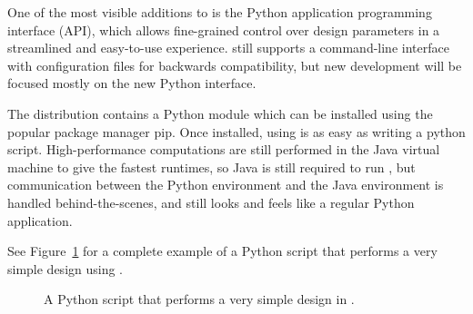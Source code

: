 
One of the most visible additions to  is the Python application programming interface (API), which allows fine-grained control over design parameters in a streamlined and easy-to-use experience.  still supports a command-line interface with configuration files for backwards compatibility, but new development will be focused mostly on the new Python interface. %

The  distribution contains a Python module which can be installed using the popular package manager {\sc pip}. Once installed, using  is as easy as writing a python script. High-performance computations are still performed in the Java virtual machine to give the fastest runtimes, so Java is still required to run , but communication between the Python environment and the Java environment is handled behind-the-scenes, and  still looks and feels like a regular Python application.

See Figure~\ref{fig:python} for a complete example of a Python script that performs a very simple design using .

\begin{figure}
{
	
}
\caption{A Python script that performs a very simple design in .}
\label{fig:python}
\end{figure}
